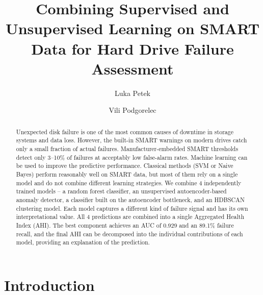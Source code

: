 \documentclass[sigconf,natbib=false]{acmart}
\begin{document}
\title[Combining Supervised and Unsupervised Learning for Hard Drive Failure Assessment]{Combining Supervised and Unsupervised Learning on SMART Data for Hard Drive Failure Assessment}

\author{Luka Petek}

\author{Vili Podgorelec}

\renewcommand{\shortauthors}{Petek and Podgorelec}

\begin{abstract}

Unexpected disk failure is one of the most common causes of downtime in storage systems and data loss. However, the built-in SMART warnings on modern drives catch only a small fraction of actual failures. Manufacturer-embedded SMART thresholds detect only 3--10\% of failures at acceptably low false-alarm rates. Machine learning can be used to improve the predictive performance. Classical methods (SVM or Naive Bayes) perform reasonably well on SMART data, but most of them rely on a single model and do not combine different learning strategies. We combine 4 independently trained models -- a random forest classifier, an unsupervised autoencoder-based anomaly detector, a classifier built on the autoencoder bottleneck, and an HDBSCAN clustering model. Each model captures a different kind of failure signal and has its own interpretational value. All 4 predictions are combined into a single Aggregated Health Index (AHI). The best component achieves an AUC of 0.929 and an 89.1\% failure recall, and the final AHI can be decomposed into the individual contributions of each model, providing an explanation of the prediction.
\end{abstract}


\maketitle

\section{Introduction}
\label{sec:introduction}
\end{document}
